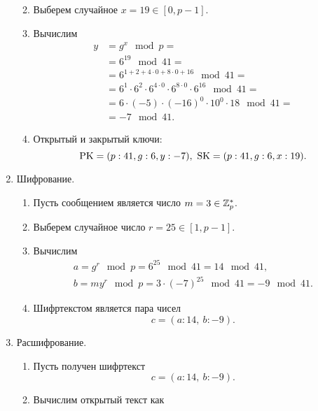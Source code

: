 \begin{enumerate}
\begin{enumerate}
\begin{table}[!ht]
{\begin{tabular}{|c|c|c|c|c|c|c|c|c|}
                    \end{tabular} }
                \end{table}
            \item Выберем случайное $x = 19 \in [0, p-1]$.
            \item Вычислим
                \[ \begin{array}{ll}
                    y & = g^x \mod p = \\
                    & = 6^{19} \mod 41 = \\
                    & = 6^{1 + 2 + 4 \cdot 0 + 8 \cdot 0 + 16} \mod 41 = \\
                    & = 6^1 \cdot 6^2 \cdot 6^{4 \cdot 0} \cdot 6^{8 \cdot 0} \cdot 6^{16} \mod 41 = \\
                    & = 6 \cdot (-5) \cdot (-16)^0 \cdot 10^0 \cdot 18 \mod 41 = \\
                    & = -7 \mod 41.
                \end{array} \]
            \item Открытый и закрытый ключи:
                \[ \textrm{PK} = (p:41, g:6, y:-7), ~ \textrm{SK} = (p:41, g:6, x:19). \]
        \end{enumerate}
    \item Шифрование.
        \begin{enumerate}
            \item Пусть сообщением является число $m = 3 \in \mathbb{Z}_p^*$.
            \item Выберем случайное число $r = 25 \in [1, p-1]$.
            \item Вычислим
                \[ \begin{array}{l}
                    a = g^r \mod p = 6^{25} \mod 41 = 14 \mod 41, \\
                    b = m y^r \mod p = 3 \cdot (-7)^{25} \mod 41 = -9 \mod 41.
                \end{array} \]
            \item Шифртекстом является пара чисел
                \[ c = (a:14, ~ b:-9). \]
        \end{enumerate}
    \item Расшифрование.
        \begin{enumerate}
            \item Пусть получен шифртекст
                \[ c = (a:14, ~ b:-9). \]
            \item Вычислим открытый текст как
                \[ \begin{array}{ll}

\end{array}\]
\end{enumerate}
\end{enumerate}
